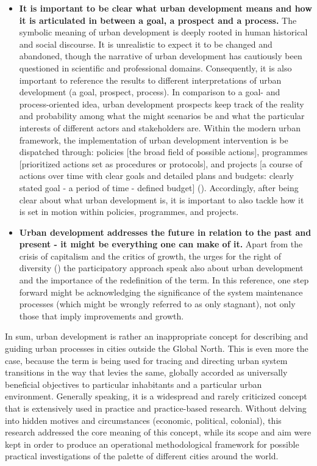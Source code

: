 \documentclass[11pt]{report}
\begin{document}
{{{\begin{itemize}
\item \textbf{It is important to be clear what urban development means and how it is articulated in between a goal, a prospect and a process.}
The symbolic meaning of urban development is deeply rooted in human historical and social discourse. It is unrealistic to expect it to be changed and abandoned, though the narrative of urban development has cautiously been questioned in scientific and professional domains. Consequently, it is also important to reference the results to different interpretations of urban development (a goal, prospect, process). In comparison to a goal- and process-oriented idea, urban development prospects keep track of the reality and probability among what the might scenarios be and what the particular interests of different actors and stakeholders are. Within the modern urban framework, the implementation of urban development intervention is be dispatched through: policies [the broad field of possible actions],
programmes [prioritized actions set as procedures or protocols],
and
projects [a course of actions over time with clear goals and detailed plans and budgets: clearly stated goal - a period of time - defined budget] (\href{Vujosevic}{\citealt{vujosevic_regionalizam_2015}}).
Accordingly, after being clear about what urban development is, it is important to also tackle how it is set in motion within policies, programmes, and projects.

\item \textbf{Urban development addresses the future in relation to the past and present - it might be everything one can make of it.}
Apart from the crisis of capitalism and the critics of growth, the urges for the right of diversity  (\href{Amin}{\citealt{amin_good_2006}}) the participatory approach speak also about urban development and the importance of the redefinition of the term. In this reference, one step forward might be acknowledging the significance of the system maintenance processes (which might be wrongly referred to as only stagnant), not only those that imply improvements and growth.

\end{itemize}

In sum, urban development is rather an inappropriate concept for describing and guiding urban processes in cities outside the Global North.
This is even more the case, because the term is being used for tracing and directing urban system transitions in the way that levies the same, globally accorded as universally beneficial objectives to particular inhabitants and a particular urban environment. Generally speaking, it is a widespread and rarely criticized concept that is extensively used in practice and practice-based research. Without delving into hidden motives and circumstances (economic, political, colonial), this research addressed the core meaning of this concept, while its scope and aim were kept in order to produce an operational methodological framework for possible practical investigations of the palette of different cities around the world.

}}}
\end{document}
